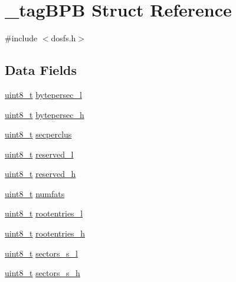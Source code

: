 \hypertarget{struct__tag_b_p_b}{\section{\-\_\-tag\-B\-P\-B Struct Reference}
\label{struct__tag_b_p_b}
}


{\ttfamily \#include $<$dosfs.\-h$>$}

\subsection*{Data Fields}
\begin{DoxyCompactItemize}
\item 
\hyperlink{stdint_8h_aba7bc1797add20fe3efdf37ced1182c5}{uint8\-\_\-t} \hyperlink{struct__tag_b_p_b_abc6e118f3b0bd4d9ca38003a7505f1f7}{bytepersec\-\_\-l}
\item 
\hyperlink{stdint_8h_aba7bc1797add20fe3efdf37ced1182c5}{uint8\-\_\-t} \hyperlink{struct__tag_b_p_b_a2a4fd74f8aefcad0745420989433c6bf}{bytepersec\-\_\-h}
\item 
\hyperlink{stdint_8h_aba7bc1797add20fe3efdf37ced1182c5}{uint8\-\_\-t} \hyperlink{struct__tag_b_p_b_adc3def0c79541dad2f5e90424b784b2c}{secperclus}
\item 
\hyperlink{stdint_8h_aba7bc1797add20fe3efdf37ced1182c5}{uint8\-\_\-t} \hyperlink{struct__tag_b_p_b_a076add418bb8ca1994ff0816795cf3ac}{reserved\-\_\-l}
\item 
\hyperlink{stdint_8h_aba7bc1797add20fe3efdf37ced1182c5}{uint8\-\_\-t} \hyperlink{struct__tag_b_p_b_ab54c9d454d0ed1051ee1324a15712ce7}{reserved\-\_\-h}
\item 
\hyperlink{stdint_8h_aba7bc1797add20fe3efdf37ced1182c5}{uint8\-\_\-t} \hyperlink{struct__tag_b_p_b_a0d1d00766ed88a28af9933452ddc0e1e}{numfats}
\item 
\hyperlink{stdint_8h_aba7bc1797add20fe3efdf37ced1182c5}{uint8\-\_\-t} \hyperlink{struct__tag_b_p_b_aaffc05fd0f136b6eb9e156b08654b91a}{rootentries\-\_\-l}
\item 
\hyperlink{stdint_8h_aba7bc1797add20fe3efdf37ced1182c5}{uint8\-\_\-t} \hyperlink{struct__tag_b_p_b_a5eda6b74b493d777364fc99f0aa5c655}{rootentries\-\_\-h}
\item 
\hyperlink{stdint_8h_aba7bc1797add20fe3efdf37ced1182c5}{uint8\-\_\-t} \hyperlink{struct__tag_b_p_b_aee93eff1b83b89f70c1c0ca5740b9b82}{sectors\-\_\-s\-\_\-l}
\item 
\hyperlink{stdint_8h_aba7bc1797add20fe3efdf37ced1182c5}{uint8\-\_\-t} \hyperlink{struct__tag_b_p_b_a802a986b05ee2c36a3ac5925b0342031}{sectors\-\_\-s\-\_\-h}

\end{DoxyCompactItemize}
